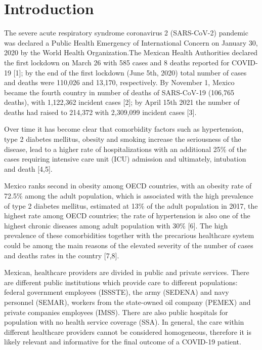 \documentclass[10pt,letterpaper]{article}
\begin{document}
\hypertarget{introduction}{%
\section{Introduction}\label{introduction}}

The severe acute respiratory syndrome coronavirus 2 (SARS-CoV-2)
pandemic was declared a Public Health Emergency of International Concern
on January 30, 2020 by the World Health Organization.The Mexican Health
Authorities declared the first lockdown on March 26 with 585 cases and 8
deaths reported for COVID-19 {[}1{]}; by the end of the first lockdown
(June 5th, 2020) total number of cases and deaths were 110,026 and
13,170, respectively. By November 1, Mexico became the fourth country in
number of deaths of SARS-CoV-19 (106,765 deaths), with 1,122,362
incident cases {[}2{]}; by April 15th 2021 the number of deaths had
raised to 214,372 with 2,309,099 incident cases {[}3{]}.

Over time it has become clear that comorbidity factors such as
hypertension, type 2 diabetes mellitus, obesity and smoking increase the
seriousness of the disease, lead to a higher rate of hospitalizations
with an additional 25\% of the cases requiring intensive care unit (ICU)
admission and ultimately, intubation and death {[}4,5{]}.

Mexico ranks second in obesity among OECD countries, with an obesity
rate of 72.5\% among the adult population, which is associated with the
high prevalence of type 2 diabetes mellitus, estimated at 13\% of the
adult population in 2017, the highest rate among OECD countries; the
rate of hypertension is also one of the highest chronic diseases among
adult population with 30\% {[}6{]}. The high prevalence of these
comorbidities together with the precarious healthcare system could be
among the main reasons of the elevated severity of the number of cases
and deaths rates in the country {[}7,8{]}.

Mexican, healthcare providers are divided in public and private
services. There are different public institutions which provide care to
different populations: federal government employees (ISSSTE), the army
(SEDENA) and navy personnel (SEMAR), workers from the state-owned oil
company (PEMEX) and private companies employees (IMSS). There are also
public hospitals for population with no health service coverage (SSA).
In general, the care within different healthcare providers cannot be
considered homogeneous, therefore it is likely relevant and informative
for the final outcome of a COVID-19 patient.
\end{document}
